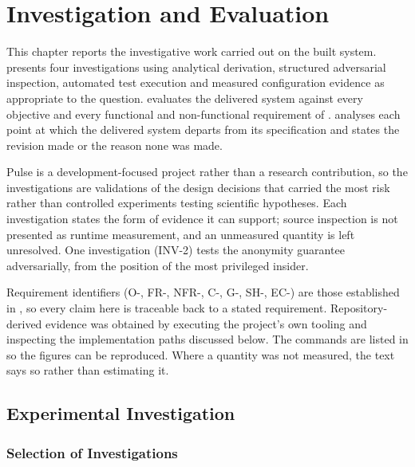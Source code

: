 \chapter{Investigation and Evaluation}
\label{ch:evaluation}

This chapter reports the investigative work carried out on the built system.
 presents four investigations using analytical
derivation, structured adversarial inspection, automated test execution and
measured configuration evidence as appropriate to the question.
 evaluates the delivered system against every objective
and every functional and non-functional requirement of .
 analyses each point at which the delivered system departs
from its specification and states the revision made or the reason none was made.

Pulse is a development-focused project rather than a research contribution, so
the investigations are validations of the design decisions that carried the most
risk rather than controlled experiments testing scientific hypotheses. Each
investigation states the form of evidence it can support; source inspection is
not presented as runtime measurement, and an unmeasured quantity is left
unresolved. One investigation (INV-2) tests the anonymity guarantee
adversarially, from the position of the most privileged insider.

Requirement identifiers (O-, FR-, NFR-, C-, G-, SH-, EC-) are those established
in , so every claim here is
traceable back to a stated requirement. Repository-derived evidence was obtained
by executing the project's own tooling and inspecting the implementation paths
discussed below. The commands are listed in  so the
figures can be reproduced. Where a quantity was not measured, the text says so
rather than estimating it.

\section{Experimental Investigation}
\label{sec:investigation}

\subsection{Selection of Investigations}
\label{subsec:investigation-selection}


